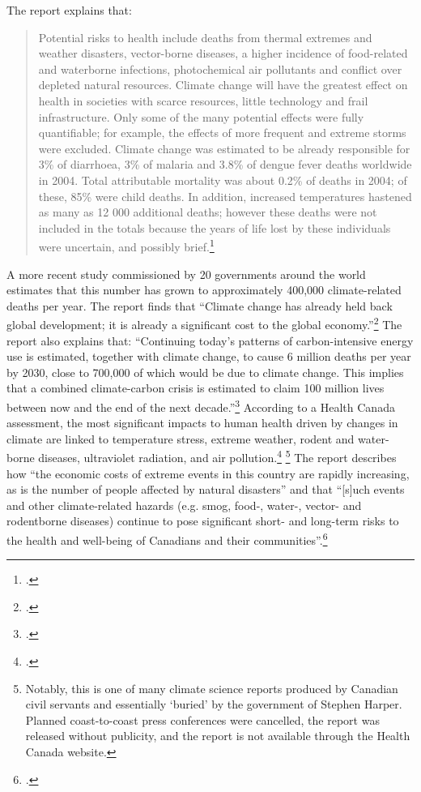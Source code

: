 The report explains that:
\begin{quote}
Potential risks to health include deaths from thermal extremes and weather disasters, vector-borne diseases, a higher incidence of food-related and waterborne infections, photochemical air pollutants and conflict over depleted natural resources. Climate change will have the greatest effect on health in societies with scarce resources, little technology and frail infrastructure. Only some of the many potential effects were fully quantifiable; for example, the effects of more frequent and extreme storms were excluded. Climate change was estimated to be already responsible for 3\% of diarrhoea, 3\% of malaria and 3.8\% of dengue fever deaths worldwide in 2004. Total attributable mortality was about 0.2\% of deaths in 2004; of these, 85\% were child deaths. In addition, increased temperatures hastened as many as 12 000 additional deaths; however these deaths were not included in the totals because the years of life lost by these individuals were uncertain, and possibly brief.\footcite[][p. 24]{WHOGlobalHealthRisks}
\end{quote}
A more recent study commissioned by 20 governments around the world estimates that this number has grown to approximately 400,000 climate-related deaths per year.
The report finds that ``Climate change has already held back global development; it is already a significant cost to the global economy.''\footcite[][p. 16]{DARACVM}
The report also explains that: ``Continuing today's patterns of carbon-intensive energy use is estimated, together with climate 
change, to cause 6 million deaths per year by 2030, close to 700,000 of which would be due to climate change. This implies that a combined climate-carbon crisis is estimated to claim 100 million lives between now and the end of the next decade.''\footcite[][p. 17]{DARACVM}
According to a Health Canada assessment, the most significant impacts to human health driven by changes in climate are linked to temperature stress, extreme weather, rodent and water-borne diseases, ultraviolet radiation, and air pollution.\footcite[][]{HHInACC} \footnote{Notably, this is one of many climate science reports produced by Canadian civil servants and essentially `buried' by the government of Stephen Harper. Planned coast-to-coast press conferences were cancelled, the report was released without publicity, and the report is not available through the Health Canada website.}
The report describes how ``the economic costs of extreme events in this country are rapidly increasing, as is the number of people affected by natural disasters'' and that ``[s]uch events and other climate-related hazards (e.g. smog, food-, water-, vector- and rodentborne diseases) continue to pose significant short- and long-term risks to the health and well-being of Canadians and their communities''.\footcite[][p. 432]{HHInACC}



